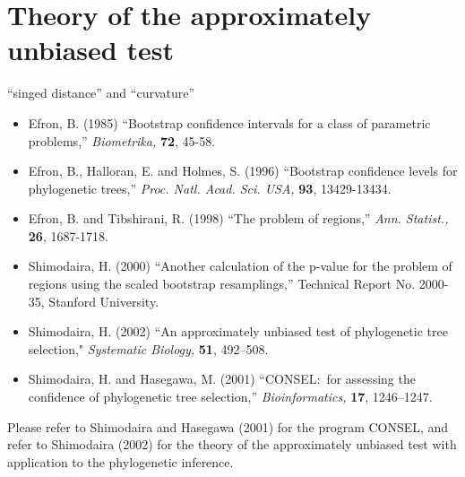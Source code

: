 \documentclass[12pt]{article}
\begin{document}
\section{Theory of the approximately unbiased test}

``singed distance'' and ``curvature''

\begin{itemize}
 \item Efron, B. (1985) ``Bootstrap confidence intervals for a class of
       parametric problems,'' {\it Biometrika,} {\bf 72}, 45-58.
 \item Efron, B., Halloran, E. and Holmes, S. (1996) ``Bootstrap
       confidence levels for phylogenetic
       trees,'' {\it Proc. Natl. Acad. Sci. USA,} {\bf 93}, 13429-13434.
 \item Efron, B. and Tibshirani, R. (1998) ``The problem of
       regions,'' {\it Ann. Statist.,} {\bf 26}, 1687-1718.
 \item Shimodaira, H. (2000) ``Another calculation of the p-value for the
       problem of regions using the scaled bootstrap
       resamplings,'' Technical Report No. 2000-35, Stanford University.
 \item Shimodaira, H. (2002) ``An approximately unbiased test of
       phylogenetic tree selection," {\it Systematic Biology,} {\bf
       51}, 492--508.
 \item Shimodaira, H. and Hasegawa, M. (2001) ``CONSEL:~for assessing the
       confidence of phylogenetic tree selection,''  {\it
       Bioinformatics,} {\bf 17}, 1246--1247.
\end{itemize}

Please refer to Shimodaira and Hasegawa (2001) for the program CONSEL,
and refer to Shimodaira (2002) for the theory of the approximately
unbiased test with application to the phylogenetic inference.
\end{document}
